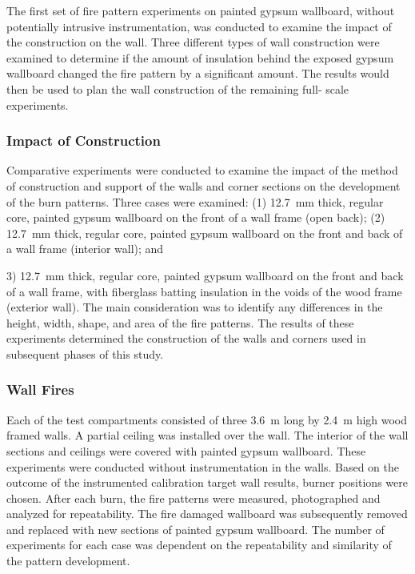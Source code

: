 \documentclass[twoside]{uocthesis}
\begin{document}
The first set of fire pattern experiments on painted gypsum wallboard, without potentially intrusive instrumentation, was conducted to examine the impact of the construction on the wall. Three different types of wall construction were examined to determine if the amount of insulation behind the exposed gypsum wallboard changed the fire pattern by a significant amount.  The results would then be used to plan the wall construction of the remaining full- scale experiments. 

\subsubsection{Impact of Construction}

Comparative experiments were conducted to examine the impact of the method of construction and support of the walls and corner sections on the development of the burn patterns.  Three cases were examined: (1) 12.7~mm thick, regular core, painted gypsum wallboard on the front of a wall frame (open back); (2) 12.7~mm thick, regular core, painted gypsum wallboard on the front and back of a wall frame (interior wall); and {3) 12.7~mm thick, regular core, painted gypsum wallboard on the front and back of a wall frame, with fiberglass batting insulation in the voids of the wood frame (exterior wall).  The main consideration was to identify any differences in the height, width, shape, and area of the fire patterns. The results of these experiments determined the construction of the walls and corners used in subsequent phases of this study.

\subsubsection{Wall Fires}

Each of the test compartments consisted of three 3.6~m long by 2.4~m high wood framed walls. A partial ceiling was installed over the wall. The interior of the wall sections and ceilings were covered with painted gypsum wallboard.  These experiments were conducted without instrumentation in the walls.  Based on the outcome of the instrumented calibration target wall results, burner positions were chosen. After each burn, the fire patterns were measured, photographed and analyzed for repeatability. The fire damaged wallboard was subsequently removed and replaced with new sections of painted gypsum wallboard. The number of experiments for each case was dependent on the repeatability and similarity of the pattern development.

}
\end{document}
